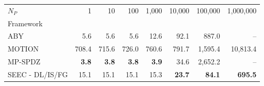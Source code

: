 \begin{tabular}{lrrrrrrr}
\toprule
$N_P$ & 1 & 10 & 100 & 1,000 & 10,000 & 100,000 & 1,000,000 \\
Framework &  &  &  &  &  &  &  \\
\midrule
ABY~\cite{DSZ15} & 5.6 & 5.6 & 5.6 & 12.6 & 92.1 & 887.0 & -- \\
MOTION~\cite{BDST22} & 708.4 & 715.6 & 726.0 & 760.6 & 791.7 & 1,595.4 & 10,813.4 \\
MP-SPDZ~\cite{CCS:Keller20} & \bfseries 3.8 & \bfseries 3.8 & \bfseries 3.8 & \bfseries 3.9 & 34.6 & 2,652.2 & -- \\
SEEC - DL/IS/FG & 15.1 & 15.1 & 15.1 & 15.3 & \bfseries 23.7 & \bfseries 84.1 & \bfseries 695.5 \\
\bottomrule
\end{tabular}
